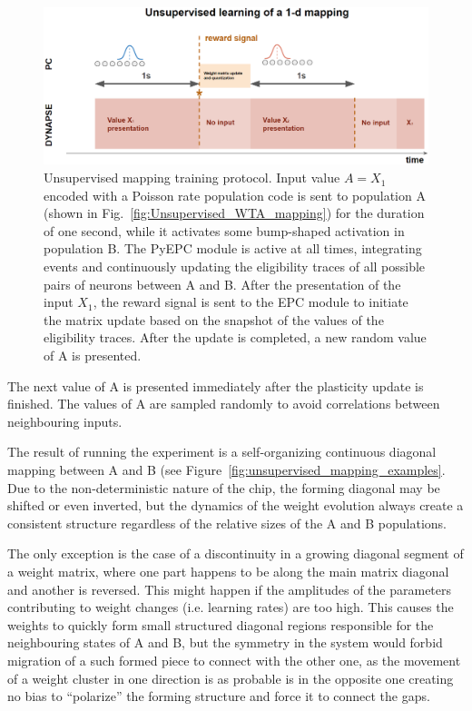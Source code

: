 \begin{figure}[h]
  \centering
    \includegraphics[width=\linewidth]{img/chapter5/unsupervised_mapping_training.png}
    \caption[Unsupervised mapping training protocol]{Unsupervised mapping training protocol. Input value $A=X_1$ encoded with a Poisson rate population code is sent to population A (shown in Fig.~\ref{fig:Unsupervised_WTA_mapping}) for the duration of one second, while it activates some bump-shaped activation in population B. The PyEPC module is active at all times, integrating events and continuously updating the eligibility traces of all possible pairs of neurons between A and B. After the presentation of the input $X_1$, the reward signal is sent to the EPC module to initiate the matrix update based on the snapshot of the values of the eligibility traces. After the update is completed, a new random value of A is presented.}
  \label{fig:Unsupervised_mapping_training}
\end{figure}



The next value of A is presented immediately after the plasticity update is finished. The values of A are sampled randomly to avoid correlations between neighbouring inputs.

The result of running the experiment is a self-organizing continuous diagonal mapping between A and B (see Figure~\ref{fig:unsupervised_mapping_examples}. Due to the non-deterministic nature of the chip, the forming diagonal may be shifted or even inverted, but the dynamics of the weight evolution always create a consistent structure regardless of the relative sizes of the A and B populations.

The only exception is the case of a discontinuity in a growing diagonal segment of a weight matrix, where one part happens to be along the main matrix diagonal and another is reversed. This might happen if the amplitudes of the parameters contributing to weight changes (i.e. learning rates) are too high. This causes the weights to quickly form small structured diagonal regions responsible for the neighbouring states of A and B, but the symmetry in the system would forbid migration of a such formed piece to connect with the other one, as the movement of a weight cluster in one direction is as probable is in the opposite one creating no bias to ``polarize'' the forming structure and force it to connect the gaps.

